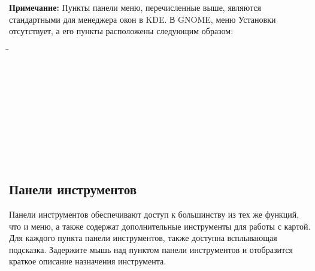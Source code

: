 \textbf{Примечание:} \nix Пункты панели меню, перечисленные выше, являются стандартными для менеджера окон в KDE. В GNOME, меню Установки отсутствует, а его пункты расположены следующим образом:
\begin{tabbing}
 \hspace{3cm}\=
 \\
 \hspace{3cm}\>
\\
 \hspace{3cm}\>
\\
 \hspace{3cm}\>
\\
\hspace{3cm}\>
 \\
 \hspace{3cm}\>
 \\
   \hspace{3cm}\>
 \\
 \hspace{3cm}\>
 \\
 \hspace{3cm}\>
 \\
 \hspace{3cm}\>
 \\
\end{tabbing}


\subsection{Панели инструментов}\label{label_toolbars}

Панели инструментов обеспечивают доступ к большинству из тех же функций, что и меню, а также
содержат дополнительные инструменты для работы с картой. Для каждого пункта панели инструментов, также доступна всплывающая подсказка. Задержите мышь над пунктом панели инструментов и отобразится
краткое описание назначения инструмента.

